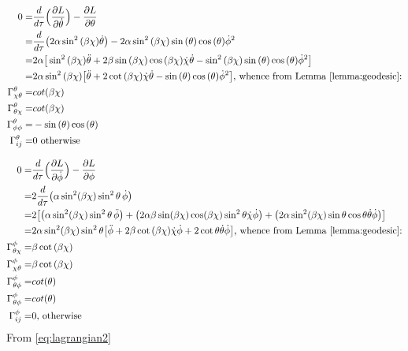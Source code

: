 \documentclass[]{article}
\begin{document}
\begin{align*}
0=&\frac{d}{d \tau}\Big(\frac{\partial L}{\partial \dot{\theta}}\Big)-\frac{\partial L}{\partial \theta}\\
=&\frac{d}{d \tau}\big(2\alpha\sin^2{(\beta\chi)}\dot{\theta}\big)-2\alpha\sin^2{(\beta\chi)}\sin{(\theta)}\cos{(\theta)}\dot{\phi}^2\\
=&2\alpha\big[\sin^2{(\beta\chi)}\ddot{\theta}+2\beta\sin{(\beta\chi)}\cos{(\beta\chi)}\dot{\chi}\dot{\theta}-\sin^2{(\beta\chi)}\sin{(\theta)}\cos{(\theta)}\dot{\phi}^2\big]\\
=&2\alpha\sin^2{(\beta\chi)}\big[\ddot{\theta}+2\cot{(\beta\chi)}\dot{\chi}\dot{\theta}-\sin{(\theta)}\cos{(\theta)}\dot{\phi}^2\big]\text{, whence from Lemma \ref{lemma:geodesic}:}\\
\Gamma^{\theta}_{\chi\theta}=&cot{(\beta\chi)}\\
\Gamma^{\theta}_{\theta\chi}=&cot{(\beta\chi)}\\
\Gamma^{\theta}_{\phi\phi}=&-\sin{(\theta)}\cos{(\theta)}\\
\Gamma^{\theta}_{ij}=&0\text{ otherwise}
\end{align*}

\begin{align*}
0=&\frac{d}{d \tau}\Big(\frac{\partial L}{\partial \dot{\phi}}\Big)-\frac{\partial L}{\partial \phi}\\
=&2\frac{d}{d \tau}\big(\alpha \sin^2(\beta \chi) \sin^2 \theta\, \dot \phi\big)\\
=&2\big[\big(\alpha \sin^2(\beta \chi) \sin^2 \theta\, \ddot \phi\big) + \big(2 \alpha \beta \sin(\beta \chi) \cos(\beta \chi) \sin^2 \theta \dot{\chi}\dot \phi\big) + \big(2\alpha \sin^2(\beta \chi) \sin \theta \cos\theta \dot\theta \dot \phi\big)\big]\\
=&2\alpha \sin^2(\beta \chi) \sin^2 \theta\big[\ddot{\phi}+2 \beta \cot{(\beta\chi)} \dot{\chi}\dot{\phi}+2\cot{\theta\dot\theta \dot \phi}\big]\text{, whence from Lemma \ref{lemma:geodesic}:}\\
\Gamma^{\phi}_{\theta\chi}=&\beta\cot{(\beta\chi)}\\
\Gamma^{\phi}_{\chi\theta}=&\beta\cot{(\beta\chi)}\\
\Gamma^{\phi}_{\theta\phi}=&cot{(\theta)}\\
\Gamma^{\phi}_{\theta\phi}=&cot{(\theta)}\\
\Gamma^{\phi}_{ij}=&0\text{, otherwise}
\end{align*}
From \eqref{eq:lagrangian2}
\end{document}
